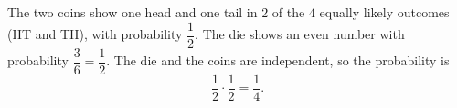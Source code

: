 The two coins show one head and one tail in $2$ of the $4$ equally likely outcomes (HT and TH), with probability $\dfrac12$. The die shows an even number with probability $\dfrac36=\dfrac12$. The die and the coins are independent, so the probability is
\[\dfrac12\cdot\dfrac12=\boxed{\dfrac14}.\]
